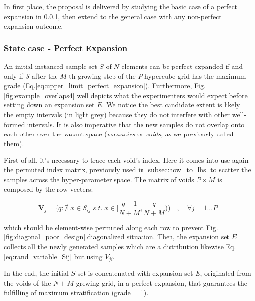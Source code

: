 \documentclass[12pt]{extarticle}
\newcommand{\meqref}[1]{Eq.\ref{#1}}
\newcommand{\mfigref}[1]{Fig.\ref{#1}}
\begin{document}
In first place, the proposal is delivered by studying the basic case of a perfect expansion in \cref{subsubsec:perfect_expansion_case}, then extend to the general case with any non-perfect expansion outcome.

\subsubsection{State case - Perfect Expansion}
\label{subsubsec:perfect_expansion_case}
An initial instanced sample set $S$ of $N$ elements can be perfect expanded if and only if $S$ after the $M$-th growing step of the $P$-hypercube grid has the maximum grade (\meqref{eq:upper_limit_perfect_expansion}). Furthermore, \mfigref{fig:example_overlaps4} well depicts what the experimenters would expect before setting down an expansion set $E$. We notice the best candidate extent is likely the empty intervals (in light grey) because they do not interfere with other well-formed intervals. It is also imperative that the new samples do not overlap onto each other over the vacant space (\textit{vacancies} or \textit{voids}, as we previously called them).

First of all, it's necessary to trace each void's index. Here it comes into use again the permuted index matrix, previously used in \cref{subsec:how_to_lhs} to scatter the samples across the hyper-parameter space. The matrix of voids $P \times M$ is composed by the row vectors: 

\begin{equation}
\label{eq:voids_matrix}
\textbf{V}_j = \bigg( q : \nexists\; x \in S_{ij} \; s.t. \; x \in \Big[\frac{q-1}{N+M}, \frac{q}{N+M}\Big) \bigg) \quad, \quad \forall j = 1...P
\end{equation}

which should be element-wise permuted along each row to prevent \mfigref{fig:diagonal_poor_design} diagonalized situation.
Then, the expansion set $E$ collects all the newly generated samples which are a distribution likewise \meqref{eq:rand_variable_Sij} but using $V_{ji}$. 

In the end, the initial $S$ set is concatenated with expansion set $E$, originated from the voids of the $N+M$ growing grid, in a perfect expansion, that guarantees the fulfilling of maximum stratification (grade = 1). 
\end{document}
